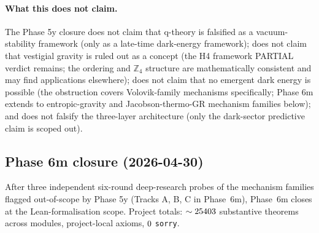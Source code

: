 \documentclass[aps,prd,reprint,nofootinbib,superscriptaddress]{revtex4-2}
\begin{document}
\paragraph{What this does not claim.} The Phase 5y closure does not
claim that q-theory is falsified as a vacuum-stability framework
(only as a late-time dark-energy framework); does not claim that
vestigial gravity is ruled out as a concept (the H4 framework
PARTIAL verdict remains; the ordering and $\mathbb{Z}_4$ structure
are mathematically consistent and may find applications elsewhere);
does not claim that no emergent dark energy is possible (the
obstruction covers Volovik-family mechanisms specifically; Phase 6m
extends to entropic-gravity and Jacobson-thermo-GR mechanism families
below); and does not falsify the three-layer architecture (only the
dark-sector predictive claim is scoped out).

\subsection{Phase 6m closure (2026-04-30)}

After three independent six-round deep-research probes of the mechanism
families flagged out-of-scope by Phase 5y (Tracks A, B, C in Phase~6m),
Phase~6m closes at the Lean-formalisation scope. Project totals:
$\sim 25403$ substantive theorems across
\leanmodules{} modules, \axiomcount{} project-local axioms,
$0$ \texttt{sorry}.
\end{document}
